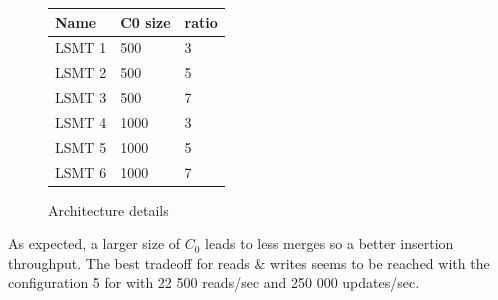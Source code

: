 \documentclass{sig-alternate-05-2015}
\begin{document}
\begin{figure}
\centering
\begin{tabular}{|l|l|l|}
\hline
Name   & C0 size & ratio \\ \hline
LSMT 1 & 500     & 3     \\ \hline
LSMT 2 & 500     & 5     \\ \hline
LSMT 3 & 500     & 7     \\ \hline
LSMT 4 & 1000    & 3     \\ \hline
LSMT 5 & 1000    & 5     \\ \hline
LSMT 6 & 1000    & 7     \\ \hline
\end{tabular}
\caption{Architecture details}
\label{fig:details}
\end{figure}

As expected, a larger size of $C_0$ leads to less merges so a better insertion throughput. The best tradeoff for reads \& writes seems to be reached with the configuration 5 for with 22 500 reads/sec and 250 000 updates/sec.
\end{document}
